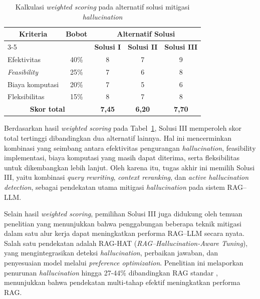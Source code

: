 \begin{table}[H]
  \centering
  \caption{Kalkulasi \textit{weighted scoring} pada alternatif solusi mitigasi \textit{hallucination}}
  \label{tbl:weighted_scoring_solusi}
  \begin{tabular}{|p{3cm}|c|c|c|c|}
    \hline
    \multicolumn{1}{|c|}{\textbf{Kriteria}} &
    \textbf{Bobot} &
    \multicolumn{3}{c|}{\textbf{Alternatif Solusi}} \\
    \cline{3-5}
    & &
    \textbf{Solusi I} &
    \textbf{Solusi II} &
    \textbf{Solusi III} \\
    \hline

    Efektivitas & 40\% &
    8 & 7 & 9 \\
    \hline

    \textit{Feasibility} & 25\% &
    7 & 6 & 8 \\
    \hline

    Biaya komputasi & 20\% &
    7 & 5 & 6 \\
    \hline

    Fleksibilitas & 15\% &
    8 & 7 & 8 \\
    \hline

    \multicolumn{2}{|c|}{\textbf{Skor total}} &
    \textbf{7,45} &
    \textbf{6,20} &
    \textbf{7,70} \\
    \hline
  \end{tabular}
\end{table}



Berdasarkan hasil \textit{weighted scoring} pada Tabel~\ref{tbl:weighted_scoring_solusi}, Solusi III memperoleh skor total tertinggi dibandingkan dua alternatif lainnya. Hal ini mencerminkan kombinasi yang seimbang antara efektivitas pengurangan \textit{hallucination}, feasibility implementasi, biaya komputasi yang masih dapat diterima, serta fleksibilitas untuk dikembangkan lebih lanjut. Oleh karena itu, tugas akhir ini memilih Solusi III, yaitu kombinasi \textit{query rewriting}, \textit{context reranking}, dan \textit{active hallucination detection}, sebagai pendekatan utama mitigasi \textit{hallucination} pada sistem RAG–LLM.

Selain hasil \textit{weighted scoring}, pemilihan Solusi III juga didukung oleh temuan penelitian yang menunjukkan bahwa penggabungan beberapa teknik mitigasi dalam satu alur kerja dapat meningkatkan performa RAG–LLM secara nyata. Salah satu pendekatan adalah RAG-HAT (\textit{RAG–Hallucination-Aware Tuning}), yang mengintegrasikan deteksi \textit{hallucination}, perbaikan jawaban, dan penyesuaian model melalui \textit{preference optimization}. Penelitian ini melaporkan penurunan \textit{hallucination} hingga 27-44\% dibandingkan RAG standar \parencite{song2024raghat}, menunjukkan bahwa pendekatan multi-tahap efektif meningkatkan performa RAG.

